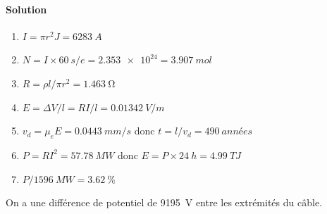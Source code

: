 \paragraph{Solution}
\begin{enumerate}
  \item $I = \pi r^2 J = \SI{6283}{A}$
  \item $N = I \times \SI{60}{s} / e = \num{2.353e24} = \SI{3.907}{mol}$
  \item $R = \rho l / \pi r^2 = \SI{1.463}{\ohm}$
  \item $E = \Delta V / l = RI / l = \SI{0.01342}{V/m}$
  \item $v_d = \mu_e E = \SI{0.0443}{mm/s}$ donc $t = l / v_d = \SI{490}{années}$
  \item $P = RI^2 = \SI{57.78}{MW}$ donc $E = P \times \SI{24}{h} = \SI{4.99}{TJ}$
  \item $P / \SI{1596}{MW} = \SI{3.62}{\percent}$
\end{enumerate}

On a une différence de potentiel de \SI{9195}{V} entre les extrémités du câble.
